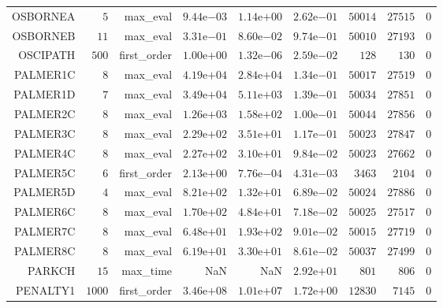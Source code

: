 \begin{longtable}{rrrrrrrrr}
OSBORNEA & \(     5\) & max\_eval & \( 9.44\)e\(-03\) & \( 1.14\)e\(+00\) & \( 2.62\)e\(-01\) & \( 50014\) & \( 27515\) & \(     0\) \\
OSBORNEB & \(    11\) & max\_eval & \( 3.31\)e\(-01\) & \( 8.60\)e\(-02\) & \( 9.74\)e\(-01\) & \( 50010\) & \( 27193\) & \(     0\) \\
OSCIPATH & \(   500\) & first\_order & \( 1.00\)e\(+00\) & \( 1.32\)e\(-06\) & \( 2.59\)e\(-02\) & \(   128\) & \(   130\) & \(     0\) \\
PALMER1C & \(     8\) & max\_eval & \( 4.19\)e\(+04\) & \( 2.84\)e\(+04\) & \( 1.34\)e\(-01\) & \( 50017\) & \( 27519\) & \(     0\) \\
PALMER1D & \(     7\) & max\_eval & \( 3.49\)e\(+04\) & \( 5.11\)e\(+03\) & \( 1.39\)e\(-01\) & \( 50034\) & \( 27851\) & \(     0\) \\
PALMER2C & \(     8\) & max\_eval & \( 1.26\)e\(+03\) & \( 1.58\)e\(+02\) & \( 1.00\)e\(-01\) & \( 50044\) & \( 27856\) & \(     0\) \\
PALMER3C & \(     8\) & max\_eval & \( 2.29\)e\(+02\) & \( 3.51\)e\(+01\) & \( 1.17\)e\(-01\) & \( 50023\) & \( 27847\) & \(     0\) \\
PALMER4C & \(     8\) & max\_eval & \( 2.27\)e\(+02\) & \( 3.10\)e\(+01\) & \( 9.84\)e\(-02\) & \( 50023\) & \( 27662\) & \(     0\) \\
PALMER5C & \(     6\) & first\_order & \( 2.13\)e\(+00\) & \( 7.76\)e\(-04\) & \( 4.31\)e\(-03\) & \(  3463\) & \(  2104\) & \(     0\) \\
PALMER5D & \(     4\) & max\_eval & \( 8.21\)e\(+02\) & \( 1.32\)e\(+01\) & \( 6.89\)e\(-02\) & \( 50024\) & \( 27886\) & \(     0\) \\
PALMER6C & \(     8\) & max\_eval & \( 1.70\)e\(+02\) & \( 4.84\)e\(+01\) & \( 7.18\)e\(-02\) & \( 50025\) & \( 27517\) & \(     0\) \\
PALMER7C & \(     8\) & max\_eval & \( 6.48\)e\(+01\) & \( 1.93\)e\(+02\) & \( 9.01\)e\(-02\) & \( 50015\) & \( 27719\) & \(     0\) \\
PALMER8C & \(     8\) & max\_eval & \( 6.19\)e\(+01\) & \( 3.30\)e\(+01\) & \( 8.61\)e\(-02\) & \( 50037\) & \( 27499\) & \(     0\) \\
PARKCH & \(    15\) & max\_time &       NaN &       NaN & \( 2.92\)e\(+01\) & \(   801\) & \(   806\) & \(     0\) \\
PENALTY1 & \(  1000\) & first\_order & \( 3.46\)e\(+08\) & \( 1.01\)e\(+07\) & \( 1.72\)e\(+00\) & \( 12830\) & \(  7145\) & \(     0\) \\

\end{longtable}
